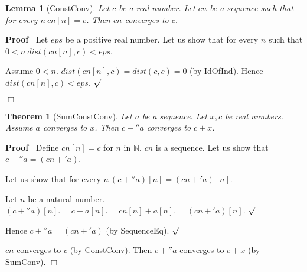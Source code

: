 \documentclass{article}
\newenvironment{forthel}{\begin{leftbar}}{\end{leftbar}}
\newenvironment{proof}{\noindent\textbf{Proof\ }}{\hspace*{\fill}$\Box$\medskip}
\newenvironment{subproof}{\begin{list}{}{}
		\item[\text{Proof}]}{\hfill $\surd$ \end{list}}
\newtheorem{lemma}{Lemma}
\newtheorem{theorem}{Theorem}
\newcommand{\NN}{\mathbb{N}}
\begin{document}
\begin{forthel}
	\begin{lemma}[ConstConv]
	Let $c$ be a real number. Let $cn$ be a sequence such that for every $n \ cn[n] = c$.
	Then $cn$ converges to $c$.
	\end{lemma}
	\begin{proof}
	Let $eps$ be a positive real number.
	Let us show that for every $n$ such that $0 < n \ dist(cn[n],c) < eps$.
	\begin{subproof}
	Assume $0 < n$.
	$dist(cn[n],c) = dist(c,c) = 0$ (by IdOfInd).
	Hence $dist(cn[n],c) < eps$.
	\end{subproof}
	\end{proof}
	
	\begin{theorem}[SumConstConv]
	Let $a$ be a sequence. Let $x,c$ be real numbers. Assume $a$ converges to $x$.
	Then $c +'' a$ converges to $c + x$.
	\end{theorem}
	\begin{proof}
	Define $cn[n] = c$ for $n$ in $\NN$.
	$cn$ is a sequence.
	Let us show that $c +'' a = (cn +' a)$.
	\begin{subproof}
	Let us show that for every $n \ (c +'' a)[n] = (cn +' a)[n]$.
	\begin{subproof}
	Let $n$ be a natural number.
	$(c +'' a)[n] .= c + a[n]
	.= cn[n] + a[n]
	.= (cn +' a)[n]$.
	\end{subproof}
	Hence $c +'' a = (cn +' a)$ (by SequenceEq).
	\end{subproof}
	$cn$ converges to $c$ (by ConstConv).
	Then $c +'' a$ converges to $c + x$ (by SumConv).
	\end{proof}
	

\end{forthel}
\end{document}
